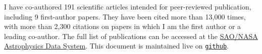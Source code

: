 I have co-authored 191 scientific articles intended for peer-reviewed 
publication, including 9 first-author papers. They have been cited more than 
13,000 times, with more than 2,300 citations on papers in which I am the first
author or a leading co-author. The full list of publications can be accessed at the 
\href{https://goo.gl/LAu9G4}{SAO/NASA Astrophysics Data System}.
%
This document is maintained live on
\href{https://github.com/cristobal-sifon/cv/blob/master/Sifon_publications.pdf}{\texttt{github}}.

